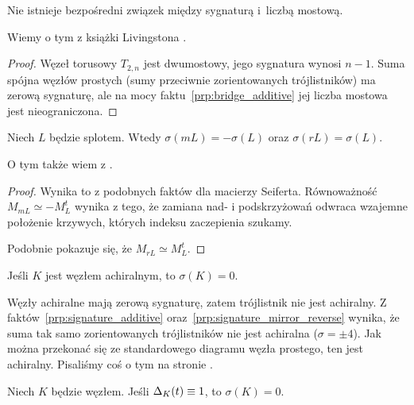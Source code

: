 \begin{corollary}
%
\label{no_relation_signature_bridge}%
    Nie istnieje bezpośredni związek między sygnaturą i~liczbą mostową.
\end{corollary}

Wiemy o tym z książki Livingstona \cite[s. 145]{livingston1993}.

\begin{proof}
    Węzeł torusowy $T_{2,n}$ jest dwumostowy, jego sygnatura wynosi $n - 1$.
    Suma spójna węzłów prostych (sumy przeciwnie zorientowanych trójlistników) ma zerową sygnaturę, ale na mocy faktu~\ref{prp:bridge_additive} jej liczba mostowa jest nieograniczona.
\end{proof}

\begin{proposition}
%
%
\label{prp:signature_mirror_reverse}%
    Niech $L$ będzie splotem.
    Wtedy $\sigma(mL) = -\sigma(L)$ oraz $\sigma(rL) = \sigma(L)$.
\end{proposition}

O tym także wiem z \cite[s. 127]{murasugi1996}.

\begin{proof}
    Wynika to z podobnych faktów dla macierzy Seiferta.
    Równoważność $M_{mL} \simeq - M_L^t$ wynika z tego, że zamiana nad- i podskrzyżowań odwraca wzajemne położenie krzywych, których indeksu zaczepienia szukamy.

    Podobnie pokazuje się, że $M_{rL} \simeq M_L^t$.
\end{proof}

\begin{corollary}
%
\label{cor:acheiral_signature}%
    Jeśli $K$ jest węzłem achiralnym, to $\sigma(K) = 0$.
\end{corollary}

Węzły achiralne mają zerową sygnaturę, zatem trójlistnik nie jest achiralny.
Z faktów~\ref{prp:signature_additive} oraz~\ref{prp:signature_mirror_reverse} wynika, że suma tak samo zorientowanych trójlistników nie jest achiralna ($\sigma = \pm 4$).
Jak można przekonać się ze standardowego diagramu węzła prostego, ten jest achiralny.
Pisaliśmy coś o tym na stronie \pageref{two_sums_of_two_trefoils}.

\begin{proposition}
\label{trivial_alexander_polynomial}%
%
    Niech $K$ będzie węzłem.
    Jeśli $\Delta_K(t) \equiv 1$, to $\sigma (K) = 0$.
\end{proposition}

